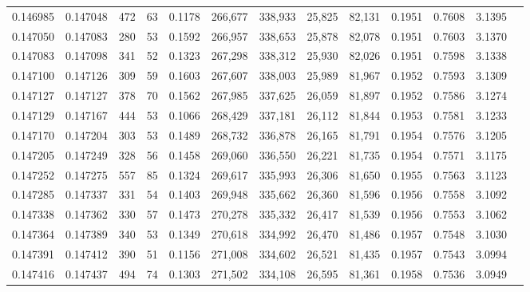 \begin{tabular}{rrrrrrrrrrrrr}
0.146985 & 0.147048 &   472 &  63 &                                     0.1178 & 266,677 & 338,933 &  25,825 &  82,131 & 0.1951 & 0.7608 & 3.1395 \\
0.147050 & 0.147083 &   280 &  53 &                                     0.1592 & 266,957 & 338,653 &  25,878 &  82,078 & 0.1951 & 0.7603 & 3.1370 \\
0.147083 & 0.147098 &   341 &  52 &                                     0.1323 & 267,298 & 338,312 &  25,930 &  82,026 & 0.1951 & 0.7598 & 3.1338 \\
0.147100 & 0.147126 &   309 &  59 &                                     0.1603 & 267,607 & 338,003 &  25,989 &  81,967 & 0.1952 & 0.7593 & 3.1309 \\
0.147127 & 0.147127 &   378 &  70 &                                     0.1562 & 267,985 & 337,625 &  26,059 &  81,897 & 0.1952 & 0.7586 & 3.1274 \\
0.147129 & 0.147167 &   444 &  53 &                                     0.1066 & 268,429 & 337,181 &  26,112 &  81,844 & 0.1953 & 0.7581 & 3.1233 \\
0.147170 & 0.147204 &   303 &  53 &                                     0.1489 & 268,732 & 336,878 &  26,165 &  81,791 & 0.1954 & 0.7576 & 3.1205 \\
0.147205 & 0.147249 &   328 &  56 &                                     0.1458 & 269,060 & 336,550 &  26,221 &  81,735 & 0.1954 & 0.7571 & 3.1175 \\
0.147252 & 0.147275 &   557 &  85 &                                     0.1324 & 269,617 & 335,993 &  26,306 &  81,650 & 0.1955 & 0.7563 & 3.1123 \\
0.147285 & 0.147337 &   331 &  54 &                                     0.1403 & 269,948 & 335,662 &  26,360 &  81,596 & 0.1956 & 0.7558 & 3.1092 \\
0.147338 & 0.147362 &   330 &  57 &                                     0.1473 & 270,278 & 335,332 &  26,417 &  81,539 & 0.1956 & 0.7553 & 3.1062 \\
0.147364 & 0.147389 &   340 &  53 &                                     0.1349 & 270,618 & 334,992 &  26,470 &  81,486 & 0.1957 & 0.7548 & 3.1030 \\
0.147391 & 0.147412 &   390 &  51 &                                     0.1156 & 271,008 & 334,602 &  26,521 &  81,435 & 0.1957 & 0.7543 & 3.0994 \\
0.147416 & 0.147437 &   494 &  74 &                                     0.1303 & 271,502 & 334,108 &  26,595 &  81,361 & 0.1958 & 0.7536 & 3.0949 \\

\end{tabular}
